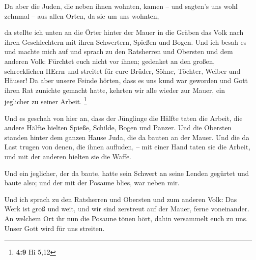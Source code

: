  Da aber die Juden, die neben ihnen wohnten, kamen -- und
sagten's uns wohl zehnmal -- aus allen Orten, da sie um uns wohnten,

 da stellte ich unten an die Örter hinter der Mauer in die
Gräben das Volk nach ihren Geschlechtern mit ihren Schwertern, Spießen
und Bogen.  Und ich besah es und machte mich auf und sprach
zu den Ratsherren und Obersten und dem anderen Volk: Fürchtet euch nicht
vor ihnen; gedenket an den großen, schrecklichen HErrn und streitet für
eure Brüder, Söhne, Töchter, Weiber und Häuser!  Da aber
unsere Feinde hörten, dass es uns kund war geworden und Gott ihren Rat
zunichte gemacht hatte, kehrten wir alle wieder zur Mauer, ein jeglicher
zu seiner Arbeit. \footnote{\textbf{4:9} Hi 5,12}

 Und es geschah von hier an, dass der Jünglinge die Hälfte
taten die Arbeit, die andere Hälfte hielten Spieße, Schilde, Bogen und
Panzer. Und die Obersten standen hinter dem ganzen Hause Juda,
 die da bauten an der Mauer. Und die da Last trugen von
denen, die ihnen aufluden, -- mit einer Hand taten sie die Arbeit, und
mit der anderen hielten sie die Waffe.

 Und ein jeglicher, der da baute, hatte sein Schwert an
seine Lenden gegürtet und baute also; und der mit der Posaune blies, war
neben mir.

 Und ich sprach zu den Ratsherren und Obersten und zum
anderen Volk: Das Werk ist groß und weit, und wir sind zerstreut auf der
Mauer, ferne voneinander.  An welchem Ort ihr nun die
Posaune tönen hört, dahin versammelt euch zu uns. Unser Gott wird für
uns streiten.

